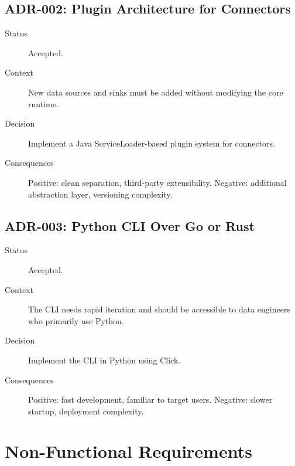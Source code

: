 \documentclass[
    language=english,
    doctype=technical-report,
    institution=none,
    titlestyle=book,
    oneside,
]{../../omnilatex}
\begin{document}
\section{ADR-002: Plugin Architecture for Connectors}

\begin{description}
    \item[Status] Accepted.
    \item[Context] New data sources and sinks must be added without
        modifying the core runtime.
    \item[Decision] Implement a Java ServiceLoader-based plugin system for
        connectors.
    \item[Consequences] Positive: clean separation, third-party
        extensibility. Negative: additional abstraction layer, versioning
        complexity.
\end{description}

\section{ADR-003: Python CLI Over Go or Rust}

\begin{description}
    \item[Status] Accepted.
    \item[Context] The CLI needs rapid iteration and should be accessible
        to data engineers who primarily use Python.
    \item[Decision] Implement the CLI in Python using Click.
    \item[Consequences] Positive: fast development, familiar to target
        users. Negative: slower startup, deployment complexity.
\end{description}

\chapter{Non-Functional Requirements}
\label{sec:nfr}
\end{document}
